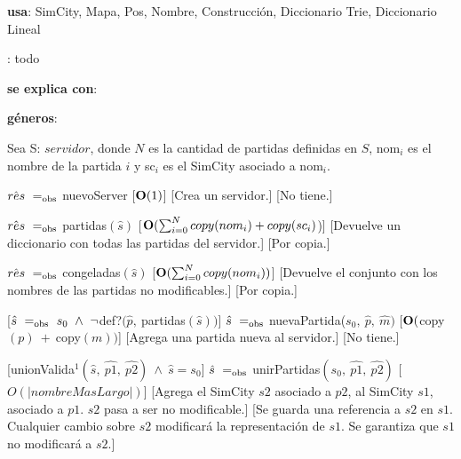 \begin{Interfaz}

    \textbf{usa}: SimCity, Mapa, Pos, Nombre, Construcción, Diccionario Trie, Diccionario Lineal
    
    : todo

    \textbf{se explica con}: 

    \textbf{géneros}: 


    Sea S: $servidor$, donde $N$ es la cantidad de partidas definidas en $S$, nom$_i$ es el nombre de la partida $i$ y sc$_i$  es el SimCity asociado a nom$_i$.

    {$\hat{res}\ \igobs\ $nuevoServer}
    [$\bold{O}(1)$]
    [Crea un servidor.]
    [No tiene.]

    {$\hat{res}\ \igobs\ $partidas$(\hat{s})$}
    [$\bold{O}(\sum_{i = 0}^{N}{copy(nom_i) + copy(sc_i)}$)]
    [Devuelve un diccionario con todas las partidas del servidor.]
    [Por copia.] %

    {$\hat{res}\ \igobs\ $congeladas$(\hat{s})$}
    [$\bold{O}(\sum_{i = 0}^{N}{copy(nom_i)})$]
    [Devuelve el conjunto con los nombres de las partidas no modificables.]
    [Por copia.]

    [$\hat{s}\ \igobs\ s_0\ \wedge\ \lnot $def?$(\hat{p},\ $partidas$(\hat{s}))$]
    {$\hat{s}\ \igobs\ $nuevaPartida($s_0,\ \hat{p},\ \hat{m})$}
    [$\bold{O}($copy$(p)\ +\ $copy$(m))$]
    [Agrega una partida nueva al servidor.]
    [No tiene.]

    [unionValida$^{1}(\hat{s},\ \hat{p1},\ \hat{p2})\ \land\ \hat{s} = s_0$]
    {$\hat{s}\ \igobs\ $unirPartidas$(s_0,\ \hat{p1},\ \hat{p2})$}
    [$O(|nombreMasLargo|)$]
    [Agrega el SimCity $s2$ asociado a $p2$, al SimCity $s1$, asociado a $p1$. $s2$ pasa a ser no modificable.]
    [Se guarda una referencia a $s2$ en $s1$. Cualquier cambio sobre $s2$ modificará la representación de $s1$. Se garantiza que $s1$ no modificará a $s2$.]


\end{Interfaz}
